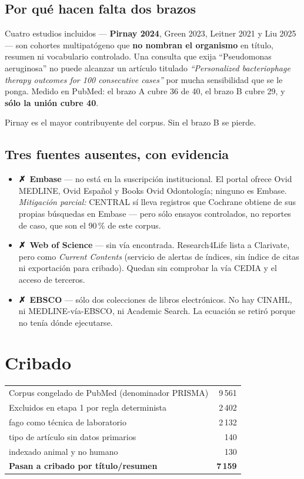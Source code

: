 \documentclass[11pt,a4paper]{article}
\newcommand{\no}{\textcolor{warn}{\textbf{✗}}}
\begin{document}
\subsection{Por qué hacen falta dos brazos}

Cuatro estudios incluidos --- \textbf{Pirnay 2024}, Green 2023, Leitner 2021 y
Liu 2025 --- son cohortes multipatógeno que \textbf{no nombran el organismo} en
título, resumen ni vocabulario controlado. Una consulta que exija ``Pseudomonas
aeruginosa'' no puede alcanzar un artículo titulado \textit{``Personalized
bacteriophage therapy outcomes for 100 consecutive cases''} por mucha
sensibilidad que se le ponga. Medido en PubMed: el brazo A cubre 36 de 40, el
brazo B cubre 29, y \textbf{sólo la unión cubre 40}.

Pirnay es el mayor contribuyente del corpus. Sin el brazo B se pierde.

\subsection{Tres fuentes ausentes, con evidencia}

\begin{itemize}[leftmargin=1.4em,itemsep=2pt]
\item \no~\textbf{Embase} --- no está en la suscripción institucional. El portal
ofrece Ovid MEDLINE, Ovid Español y Books Ovid Odontología; ninguno es Embase.
\emph{Mitigación parcial:} CENTRAL sí lleva registros que Cochrane obtiene de sus
propias búsquedas en Embase --- pero sólo ensayos controlados, no reportes de
caso, que son el 90\,\% de este corpus.
\item \no~\textbf{Web of Science} --- sin vía encontrada. Research4Life lista a
Clarivate, pero como \textit{Current Contents} (servicio de alertas de índices,
sin índice de citas ni exportación para cribado). Quedan sin comprobar la vía
CEDIA y el acceso de terceros.
\item \no~\textbf{EBSCO} --- sólo dos colecciones de libros electrónicos. No hay
CINAHL, ni MEDLINE-vía-EBSCO, ni Academic Search. La ecuación se retiró porque no
tenía dónde ejecutarse.
\end{itemize}

\section{Cribado}

\begin{center}
\begin{tabular}{@{}lr@{}}
\toprule
Corpus congelado de PubMed (denominador PRISMA) & 9\,561 \\
Excluidos en etapa 1 por regla determinista & 2\,402 \\
\quad fago como técnica de laboratorio & 2\,132 \\
\quad tipo de artículo sin datos primarios & 140 \\
\quad indexado animal y no humano & 130 \\
\midrule
\textbf{Pasan a cribado por título/resumen} & \textbf{7\,159} \\
\bottomrule
\end{tabular}
\end{center}
\end{document}
